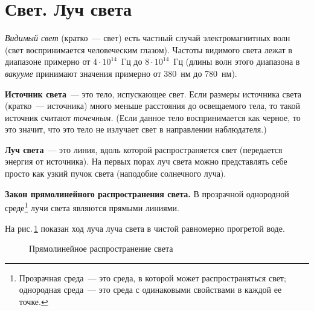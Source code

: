 \documentclass[main.tex]{subfiles}
\begin{document}

 

 

 
   

\section{Свет. Луч света}


\emph{Видимый свет} (кратко~--- свет) есть частный случай электромагнитных волн (свет воспринимается человеческим глазом). Частоты видимого света лежат в диапазоне примерно от $4\cdot10^{14}$~Гц до $8\cdot10^{14}$~Гц (длины волн этого диапазона в \emph{вакууме} принимают значения примерно от 380~нм до 780~нм).

\textbf{Источник света}~--- это тело, испускающее свет. Если размеры источника света (кратко~--- источника) много меньше расстояния до освещаемого тела, то такой источник считают \emph{точечным.} (Если данное тело воспринимается как черное, то это значит, что это тело не излучает свет в направлении наблюдателя.)

\textbf{Луч света}~--- это линия, вдоль которой распространяется свет (передается энергия от источника). На первых порах луч света можно представлять себе просто как узкий пучок света (наподобие солнечного луча).
%
\begin{law}
    \textbf{Закон прямолинейного распространения света.} В прозрачной однородной среде\footnote{Прозрачная среда~--- это среда, в которой может распространяться свет; однородная среда~--- это среда с одинаковыми свойствами в каждой ее точке.} лучи света являются прямыми линиями.
\end{law}
%
На рис.\,\ref{fig:p173} показан ход луча луча света в чистой равномерно прогретой воде.

\begin{figure}[H]
    \centering

\caption{Прямолинейное распространение света}
\label{fig:p173}
\end{figure}
\end{document}
